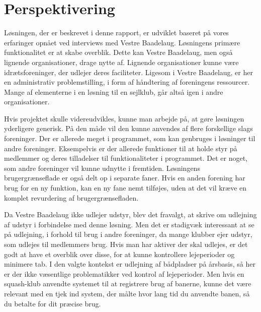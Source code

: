 \chapter{Perspektivering}
\label{cha:perspektivering}


Løsningen, der er beskrevet i denne rapport, er udviklet baseret på vores erfaringer opnået ved interviews med Vestre Baadelaug. Løsningens primære funktionalitet er at skabe overblik. Dette kan Vestre Baadelaug, men også lignende organisationer, drage nytte af. Lignende organisationer kunne være idrætsforeninger, der udlejer deres faciliteter. Ligesom i Vestre Baadelaug, er her en administrativ problemstilling, i form af håndtering af foreningens ressourcer. Mange af elementerne i en løsning til en sejlklub, går altså igen i andre organisationer.

Hvis projektet skulle videreudvikles, kunne man arbejde på, at gøre løsningen yderligere generisk. På den måde vil den kunne anvendes af flere forskellige slags foreninger. Der er allerede meget i programmet, som kan genbruges i løsninger til andre foreninger. Eksempelvis er der allerede funktioner til at holde styr på medlemmer og deres tilladelser til funktionaliteter i programmet. Det er noget, som andre foreninger vil kunne udnytte i fremtiden. Løsningens brugergrænseflade er også delt op i separate faner. Hvis en anden forening har brug for en ny funktion, kan en ny fane nemt tilføjes, uden at det vil kræve en komplet revurdering af brugergrænsefladen.

Da Vestre Baadelaug ikke udlejer udstyr, blev det fravalgt, at skrive om udlejning af udstyr i forbindelse med denne løsning. Men det er stadigvæk interessant at se på udlejning, i forhold til brug i andre foreninger, da mange klubber ejer udstyr, som udlejes til medlemmers brug. Hvis man har aktiver der skal udlejes, er det godt at have et overblik over disse, for at kunne kontrollere lejeperioder og minimere tab. I den valgte kontekst er udlejning af bådpladser på årsbasis, så her er der ikke væsentlige problematikker ved kontrol af lejeperioder. Men hvis en squash-klub anvendte systemet til at registrere brug af banerne, kunne det være relevant med en tjek ind system, der målte hvor lang tid du anvendte banen, så du betalte for dit præcise brug.


